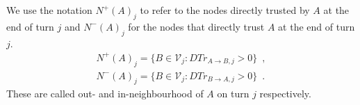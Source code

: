 \begin{definition}[Neighbourhood]
  \label{neighbourhood}
  We use the notation $N^{+}\left(A\right)_j$ to refer to the nodes directly trusted by $A$ at the end of turn $j$ and
  $N^{-}\left(A\right)_j$ for the nodes that directly trust $A$ at the end of turn $j$.
    \begin{equation}
    \begin{gathered}
      N^{+}\left(A\right)_j = \{B \in \mathcal{V}_j : DTr_{A \rightarrow B, j} > 0\} \enspace, \\
      N^{-}\left(A\right)_j = \{B \in \mathcal{V}_j : DTr_{B \rightarrow A, j} > 0\} \enspace.
    \end{gathered}
    \end{equation}
    These are called out- and in-neighbourhood of $A$ on turn $j$ respectively.
\end{definition}
